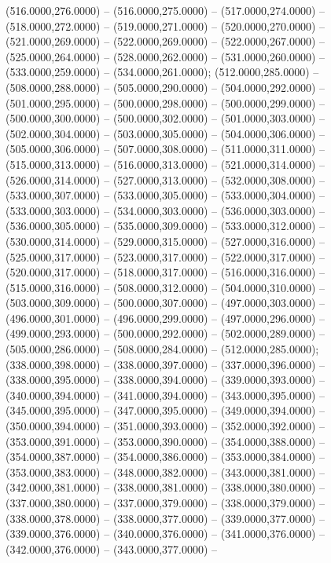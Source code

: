 \begin{scope}[draw=black,fill=cfdae61,line join=round,line width=0.208pt]
    (516.0000,276.0000) -- (516.0000,275.0000) -- (517.0000,274.0000) --
    (518.0000,272.0000) -- (519.0000,271.0000) -- (520.0000,270.0000) --
    (521.0000,269.0000) -- (522.0000,269.0000) -- (522.0000,267.0000) --
    (525.0000,264.0000) -- (528.0000,262.0000) -- (531.0000,260.0000) --
    (533.0000,259.0000) -- (534.0000,261.0000);
   (512.0000,285.0000) -- (508.0000,288.0000) --
    (505.0000,290.0000) -- (504.0000,292.0000) -- (501.0000,295.0000) --
    (500.0000,298.0000) -- (500.0000,299.0000) -- (500.0000,300.0000) --
    (500.0000,302.0000) -- (501.0000,303.0000) -- (502.0000,304.0000) --
    (503.0000,305.0000) -- (504.0000,306.0000) -- (505.0000,306.0000) --
    (507.0000,308.0000) -- (511.0000,311.0000) -- (515.0000,313.0000) --
    (516.0000,313.0000) -- (521.0000,314.0000) -- (526.0000,314.0000) --
    (527.0000,313.0000) -- (532.0000,308.0000) -- (533.0000,307.0000) --
    (533.0000,305.0000) -- (533.0000,304.0000) -- (533.0000,303.0000) --
    (534.0000,303.0000) -- (536.0000,303.0000) -- (536.0000,305.0000) --
    (535.0000,309.0000) -- (533.0000,312.0000) -- (530.0000,314.0000) --
    (529.0000,315.0000) -- (527.0000,316.0000) -- (525.0000,317.0000) --
    (523.0000,317.0000) -- (522.0000,317.0000) -- (520.0000,317.0000) --
    (518.0000,317.0000) -- (516.0000,316.0000) -- (515.0000,316.0000) --
    (508.0000,312.0000) -- (504.0000,310.0000) -- (503.0000,309.0000) --
    (500.0000,307.0000) -- (497.0000,303.0000) -- (496.0000,301.0000) --
    (496.0000,299.0000) -- (497.0000,296.0000) -- (499.0000,293.0000) --
    (500.0000,292.0000) -- (502.0000,289.0000) -- (505.0000,286.0000) --
    (508.0000,284.0000) -- (512.0000,285.0000);
   (338.0000,398.0000) -- (338.0000,397.0000) --
    (337.0000,396.0000) -- (338.0000,395.0000) -- (338.0000,394.0000) --
    (339.0000,393.0000) -- (340.0000,394.0000) -- (341.0000,394.0000) --
    (343.0000,395.0000) -- (345.0000,395.0000) -- (347.0000,395.0000) --
    (349.0000,394.0000) -- (350.0000,394.0000) -- (351.0000,393.0000) --
    (352.0000,392.0000) -- (353.0000,391.0000) -- (353.0000,390.0000) --
    (354.0000,388.0000) -- (354.0000,387.0000) -- (354.0000,386.0000) --
    (353.0000,384.0000) -- (353.0000,383.0000) -- (348.0000,382.0000) --
    (343.0000,381.0000) -- (342.0000,381.0000) -- (338.0000,381.0000) --
    (338.0000,380.0000) -- (337.0000,380.0000) -- (337.0000,379.0000) --
    (338.0000,379.0000) -- (338.0000,378.0000) -- (338.0000,377.0000) --
    (339.0000,377.0000) -- (339.0000,376.0000) -- (340.0000,376.0000) --
    (341.0000,376.0000) -- (342.0000,376.0000) -- (343.0000,377.0000) --

\end{scope}
